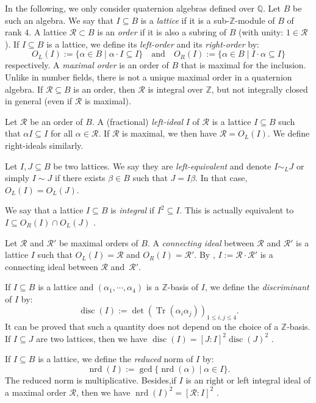 \documentclass[a4paper,10pt,notitlepage]{report}
\theoremstyle{definition}
\theoremstyle{plain}
\theoremstyle{definition}
\newcommand{\Z}{\mathbb{Z}}
\newcommand{\Q}{\mathbb{Q}}
\newcommand{\m}[1]{\mathcal{#1}}
\renewcommand{\(}{\left(}
\renewcommand{\)}{\right)}
\DeclareMathOperator{\Tr}{Tr}
\DeclareMathOperator{\disc}{disc}
\DeclareMathOperator{\nrd}{nrd}
\begin{document}
In the following, we only consider quaternion algebras defined over $\Q$. Let $B$ be such an algebra. We say that $I\subseteq B$ is a \emph{lattice} if it is a sub-$\Z$-module of $B$ of rank $4$.  A lattice $\m{R}\subset B$ is an \emph{order} if it is also a subring of $B$ (with unity: $1\in\m{R}$). If $I\subseteq B$ is a lattice, we define its \emph{left-order} and its \emph{right-order} by:
\[O_L(I):=\{\alpha\in B\mid \alpha\cdot I \subseteq I\} \quad \mbox{and} \quad O_R(I):=\{\alpha\in B\mid I\cdot\alpha \subseteq I\}\]
respectively.  A \emph{maximal order} is an order of $B$ that is maximal for the inclusion. Unlike in number fields,  there is not a unique maximal order in a quaternion algebra. If $\m{R}\subseteq B$ is an order, then $\m{R}$ is integral over $\Z$, but not integrally closed in general (even if $\m{R}$ is maximal).  

Let $\m{R}$ be an order of $B$. A (fractional) \emph{left-ideal} $I$ of $\m{R}$ is a lattice $I\subseteq B$ such that $\alpha I\subseteq I$ for all $\alpha\in \m{R}$. If $\m{R}$ is maximal, we then have $\m{R}=O_L(I)$. We define right-ideals similarly. 

Let $I, J\subseteq B$ be two lattices. We say they are \emph{left-equivalent} and denote $I\sim_L J$ or simply $I\sim J$ if there exists $\beta\in B$ such that $J=I\beta$. In that case, $O_L(I)=O_L(J)$.

We say that a lattice $I\subseteq B$ is \emph{integral} if $I^2\subseteq I$. This is actually equivalent to $I\subseteq O_R(I)\cap O_L(J)$ \cite[Lemma 16.2.8]{Voight}.

Let $\m{R}$ and $\m{R}'$ be maximal orders of $B$. A \emph{connecting ideal} between $\m{R}$ and $\m{R}'$ is a lattice $I$ such that $O_L(I)=\m{R}$ and $O_R(I)=\m{R'}$. By \cite[Lemma 17.4.7]{Voight}, $I:=\m{R}\cdot\m{R}'$ is a connecting ideal between $\m{R}$ and~$\m{R}'$.

If $I\subseteq B$ is a lattice and $(\alpha_1, \cdots,\alpha_4)$ is a $\Z$-basis of $I$, we define the \emph{discriminant} of $I$ by:
\[\disc(I):=\det\(\Tr(\alpha_i\alpha_j)\)_{1\leq i, j\leq 4}.\]
It can be proved that such a quantity does not depend on the choice of a $\Z$-basis.  If $I\subseteq J$ are two lattices, then we have $\disc(I)=[J:I]^2\disc(J)^2$ \cite[Lemma 15.2.15]{Voight}.

If $I\subseteq B$ is a lattice, we define the \emph{reduced} norm of $I$ by:
\[\nrd(I):=\gcd\{\nrd(\alpha)\mid\alpha\in I\}.\]
The reduced norm is multiplicative. Besides,if $I$ is an right or left integral ideal of a maximal order $\m{R}$, then we have $\nrd(I)^2=[\m{R}:I]^2$ \cite[Theorem 16.1.3]{Voight}. 
\end{document}
